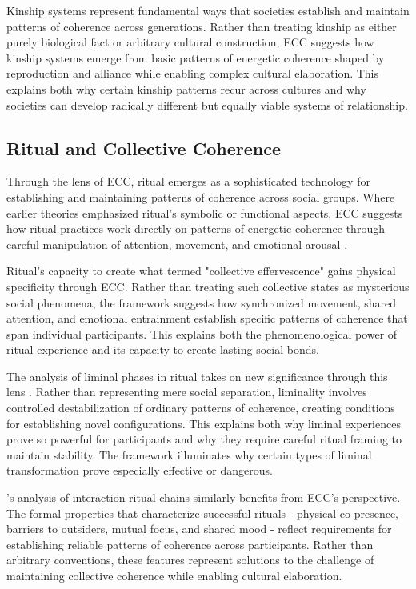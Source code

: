 Kinship systems represent fundamental ways that societies establish and maintain patterns of coherence across generations. Rather than treating kinship as either purely biological fact or arbitrary cultural construction, ECC suggests how kinship systems emerge from basic patterns of energetic coherence shaped by reproduction and alliance while enabling complex cultural elaboration. This explains both why certain kinship patterns recur across cultures and why societies can develop radically different but equally viable systems of relationship.

\subsection{Ritual and Collective Coherence}

Through the lens of ECC, ritual emerges as a sophisticated technology for establishing and maintaining patterns of coherence across social groups. Where earlier theories emphasized ritual's symbolic or functional aspects, ECC suggests how ritual practices work directly on patterns of energetic coherence through careful manipulation of attention, movement, and emotional arousal \cite{turner1969ritual,rappaport1999ritual}.

Ritual's capacity to create what \cite{durkheim1995elementary} termed "collective effervescence" gains physical specificity through ECC. Rather than treating such collective states as mysterious social phenomena, the framework suggests how synchronized movement, shared attention, and emotional entrainment establish specific patterns of coherence that span individual participants. This explains both the phenomenological power of ritual experience and its capacity to create lasting social bonds.

The analysis of liminal phases in ritual takes on new significance through this lens \cite{turner1969ritual}. Rather than representing mere social separation, liminality involves controlled destabilization of ordinary patterns of coherence, creating conditions for establishing novel configurations. This explains both why liminal experiences prove so powerful for participants and why they require careful ritual framing to maintain stability. The framework illuminates why certain types of liminal transformation prove especially effective or dangerous.

\cite{collins2004interaction}'s analysis of interaction ritual chains similarly benefits from ECC's perspective. The formal properties that characterize successful rituals - physical co-presence, barriers to outsiders, mutual focus, and shared mood - reflect requirements for establishing reliable patterns of coherence across participants. Rather than arbitrary conventions, these features represent solutions to the challenge of maintaining collective coherence while enabling cultural elaboration.

